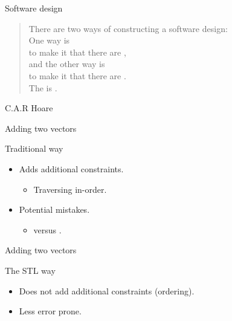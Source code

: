 \begin{frame}[t]{Software design}

\begin{quote}
There are two ways of constructing a software design:\\ 
\vspace{1em}
\pause
One way is\\
\pause
to make it  that there are ,\\
\pause
\vspace{.5em}
and the other way is\\
\pause
to make it  that there are .\\ 
\vspace{1em}
\pause
The  is . 
\end{quote}
\hfill C.A.R Hoare
\end{frame}

\begin{frame}[t,fragile]{Adding two vectors}
\begin{block}{Traditional way}

\end{block}
\pause
\begin{itemize}
  \item Adds additional constraints.
    \begin{itemize}
      \item Traversing in-order.
    \end{itemize}
  \item Potential mistakes.
    \begin{itemize}
      \item {} versus .
    \end{itemize}
\end{itemize}
\end{frame}

\begin{frame}[t,fragile]{Adding two vectors}
\begin{block}{The STL way}

\end{block}
\pause
\begin{itemize}
  \item Does not add additional constraints (ordering).
  \item Less error prone.
\end{itemize}
\end{frame}

